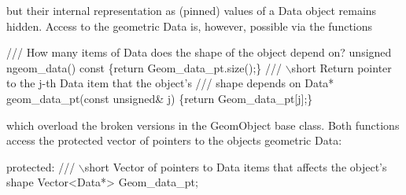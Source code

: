 but their internal representation as (pinned) values of a {\ttfamily Data} object remains hidden. Access to the geometric {\ttfamily Data} is, however, possible via the functions


\begin{DoxyCodeInclude}
 \textcolor{comment}{/// How many items of Data does the shape of the object depend on?}
 \textcolor{keywordtype}{unsigned} ngeom\_data()\textcolor{keyword}{ const }\{\textcolor{keywordflow}{return} Geom\_data\_pt.size();\}
 \textcolor{comment}{}
\textcolor{comment}{ /// \(\backslash\)short Return pointer to the j-th Data item that the object's }
\textcolor{comment}{ /// shape depends on }
\textcolor{comment}{} Data* geom\_data\_pt(\textcolor{keyword}{const} \textcolor{keywordtype}{unsigned}& j) \{\textcolor{keywordflow}{return} Geom\_data\_pt[j];\}

\end{DoxyCodeInclude}


which overload the broken versions in the {\ttfamily Geom\+Object} base class. Both functions access the protected vector of pointers to the object\textquotesingle{}s geometric {\ttfamily Data\+:} 


\begin{DoxyCodeInclude}
\textcolor{keyword}{protected}:
\textcolor{comment}{}
\textcolor{comment}{ /// \(\backslash\)short Vector of pointers to Data items that affects the object's shape}
\textcolor{comment}{} Vector<Data*> Geom\_data\_pt;

\end{DoxyCodeInclude}


